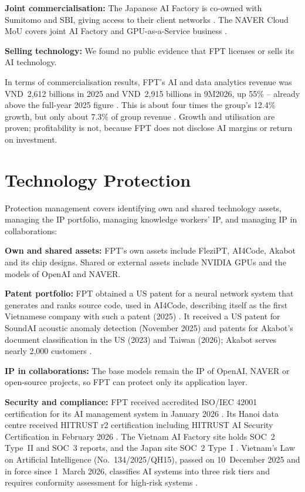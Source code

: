 \documentclass[a4paper,12pt]{report}
\begin{document}
\textbf{Joint commercialisation:} The Japanese AI Factory is co-owned with Sumitomo and SBI, giving access to their client networks \cite{S6}. The NAVER Cloud MoU covers joint AI Factory and GPU-as-a-Service business \cite{S9}.

\textbf{Selling technology:} We found no public evidence that FPT licenses or sells its AI technology.

In terms of commercialisation results, FPT's AI and data analytics revenue was VND~2,612 billions in 2025 and VND~2,915 billions in 9M2026, up 55\% -- already above the full-year 2025 figure \cite{S2}. This is about four times the group's 12.4\% growth, but only about 7.3\% of group revenue \cite{S2}. Growth and utilisation are proven; profitability is not, because FPT does not disclose AI margins or return on investment.





\chapter{Technology Protection}

Protection management covers identifying own and shared technology assets, managing the IP portfolio, managing knowledge workers' IP, and managing IP in collaborations:

\textbf{Own and shared assets:} FPT's own assets include FleziPT, AI4Code, Akabot and its chip designs. Shared or external assets include NVIDIA GPUs and the models of OpenAI and NAVER.

\textbf{Patent portfolio:} FPT obtained a US patent for a neural network system that generates and ranks source code, used in AI4Code, describing itself as the first Vietnamese company with such a patent (2025) \cite{S13}. It received a US patent for SoundAI acoustic anomaly detection (November 2025) \cite{S13} and patents for Akabot's document classification in the US (2023) and Taiwan (2026); Akabot serves nearly 2,000 customers \cite{S14}.

\textbf{IP in collaborations:} The base models remain the IP of OpenAI, NAVER or open-source projects, so FPT can protect only its application layer.

\textbf{Security and compliance:} FPT received accredited ISO/IEC 42001 certification for its AI management system in January 2026 \cite{S23}. Its Hanoi data centre received HITRUST r2 certification including HITRUST AI Security Certification in February 2026 \cite{S27}. The Vietnam AI Factory site holds SOC~2 Type~II and SOC~3 reports, and the Japan site SOC~2 Type~I \cite{S28}. Vietnam's Law on Artificial Intelligence (No.~134/2025/QH15), passed on 10~December 2025 and in force since 1~March 2026, classifies AI systems into three risk tiers and requires conformity assessment for high-risk systems \cite{S29}.
\end{document}
